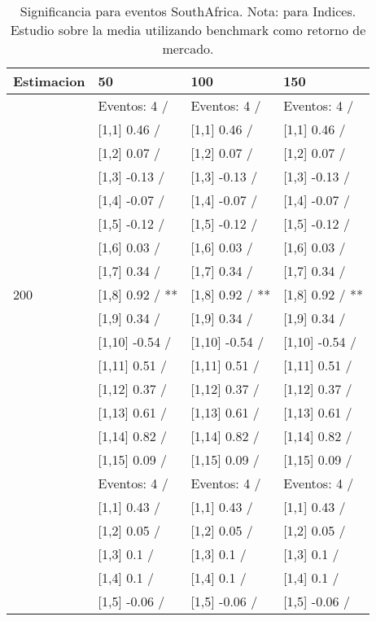 \begin{table}

\caption{Significancia para eventos SouthAfrica. Nota: para Indices. Estudio sobre la media utilizando benchmark como retorno de mercado.}
\centering
\begin{tabular}[t]{llll}
\toprule
Estimacion & 50 & 100 & 150\\
\midrule
 & Eventos:  4 / & Eventos:  4 / & Eventos:  4 /\\
 & {}[1,1] 0.46  / & {}[1,1] 0.46  / & {}[1,1] 0.46  /\\
 & {}[1,2] 0.07  / & {}[1,2] 0.07  / & {}[1,2] 0.07  /\\
 & {}[1,3] -0.13  / & {}[1,3] -0.13  / & {}[1,3] -0.13  /\\
 & {}[1,4] -0.07  / & {}[1,4] -0.07  / & {}[1,4] -0.07  /\\
\addlinespace
 & {}[1,5] -0.12  / & {}[1,5] -0.12  / & {}[1,5] -0.12  /\\
 & {}[1,6] 0.03  / & {}[1,6] 0.03  / & {}[1,6] 0.03  /\\
 & {}[1,7] 0.34  / & {}[1,7] 0.34  / & {}[1,7] 0.34  /\\
200 & {}[1,8] 0.92  / ** & {}[1,8] 0.92  / ** & {}[1,8] 0.92  / **\\
 & {}[1,9] 0.34  / & {}[1,9] 0.34  / & {}[1,9] 0.34  /\\
\addlinespace
 & {}[1,10] -0.54  / & {}[1,10] -0.54  / & {}[1,10] -0.54  /\\
 & {}[1,11] 0.51  / & {}[1,11] 0.51  / & {}[1,11] 0.51  /\\
 & {}[1,12] 0.37  / & {}[1,12] 0.37  / & {}[1,12] 0.37  /\\
 & {}[1,13] 0.61  / & {}[1,13] 0.61  / & {}[1,13] 0.61  /\\
 & {}[1,14] 0.82  / & {}[1,14] 0.82  / & {}[1,14] 0.82  /\\
\addlinespace
 & {}[1,15] 0.09  / & {}[1,15] 0.09  / & {}[1,15] 0.09  /\\
 & Eventos:  4 / & Eventos:  4 / & Eventos:  4 /\\
 & {}[1,1] 0.43  / & {}[1,1] 0.43  / & {}[1,1] 0.43  /\\
 & {}[1,2] 0.05  / & {}[1,2] 0.05  / & {}[1,2] 0.05  /\\
 & {}[1,3] 0.1  / & {}[1,3] 0.1  / & {}[1,3] 0.1  /\\
\addlinespace
 & {}[1,4] 0.1  / & {}[1,4] 0.1  / & {}[1,4] 0.1  /\\
 & {}[1,5] -0.06  / & {}[1,5] -0.06  / & {}[1,5] -0.06  /\\

\end{tabular}
\end{table}
